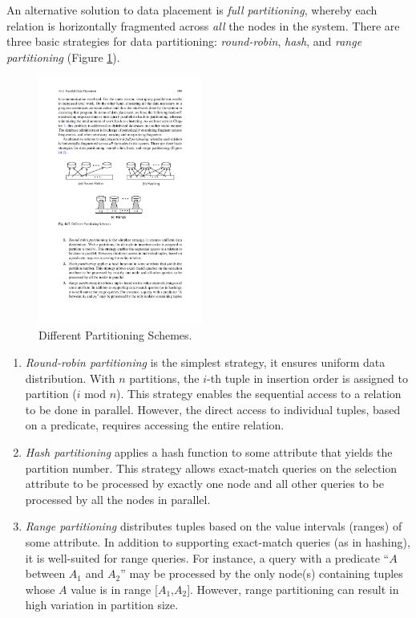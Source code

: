 \documentclass{vldb}
\newcommand{\be}{\begin{enumerate}}
\newcommand{\ee}{\end{enumerate}}
\newcommand{\ii}{\item}
\begin{document}
An alternative solution to data placement is \textit{full partitioning}, whereby each relation is horizontally fragmented across \textit{all} the nodes in the system. There are three basic strategies for data partitioning: \textit{round-robin}, \textit{hash}, and \textit{range partitioning} (Figure \ref{fig:partitioning}).

\begin{figure}[htb]
\centering
\includegraphics[width=0.48\textwidth]{partitioning}
\caption{Different Partitioning Schemes.}
\label{fig:partitioning}
\end{figure}
\be
\ii \textit{Round-robin partitioning} is the simplest strategy, it ensures uniform data distribution. 
With $n$ partitions, the $i$-th tuple in insertion order is assigned to partition ($i$ mod $n$). 
This strategy enables the sequential access to a relation to be done in parallel. However, the direct access to individual tuples, based on a predicate, requires accessing the entire relation.
\ii \textit{Hash partitioning} applies a hash function to some attribute that yields the partition number. This strategy allows exact-match queries on the selection attribute to be processed by exactly one node and all other queries to be processed by all the nodes in parallel.
\ii \textit{Range partitioning} distributes tuples based on the value intervals (ranges) of some attribute. In addition to supporting exact-match queries (as in hashing), it is well-suited for range queries. For instance, a query with a predicate “$A$ between $A_1$ and $A_2$” may be processed by the only node(s) containing tuples whose $A$ value is in range [$A_1$,$A_2$]. However, range partitioning can result in high variation in partition size.
\ee
\end{document}
